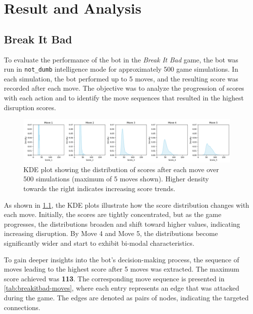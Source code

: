 \documentclass[12pt,a4paper]{report}
\begin{document}
    \chapter{Result and Analysis}
    \label{chap:score-analysis}
        \section{Break It Bad}

        To evaluate the performance of the bot in the \textit{Break It Bad} game, the bot was run in \texttt{not\_dumb} intelligence mode for approximately 500 game simulations. In each simulation, the bot performed up to 5 moves, and the resulting score was recorded after each move. The objective was to analyze the progression of scores with each action and to identify the move sequences that resulted in the highest disruption scores.

        \begin{figure}[h!]
            \centering
            \includegraphics[width=\textwidth]{images/kde-breakitbad.png}
            \caption{KDE plot showing the distribution of scores after each move over 500 simulations (maximum of 5 moves shown). Higher density towards the right indicates increasing score trends.}
            \label{fig:kde-breakitbad}
        \end{figure}

        As shown in \cref{fig:kde-breakitbad}, the KDE plots illustrate how the score distribution changes with each move. Initially, the scores are tightly concentrated, but as the game progresses, the distributions broaden and shift toward higher values, indicating increasing disruption. By Move 4 and Move 5, the distributions become significantly wider and start to exhibit bi-modal characteristics.

        To gain deeper insights into the bot’s decision-making process, the sequence of moves leading to the highest score after 5 moves was extracted. The maximum score achieved was \textbf{113}. The corresponding move sequence is presented in \cref{tab:breakitbad-moves}, where each entry represents an edge that was attacked during the game. The edges are denoted as pairs of nodes, indicating the targeted connections.
\end{document}
